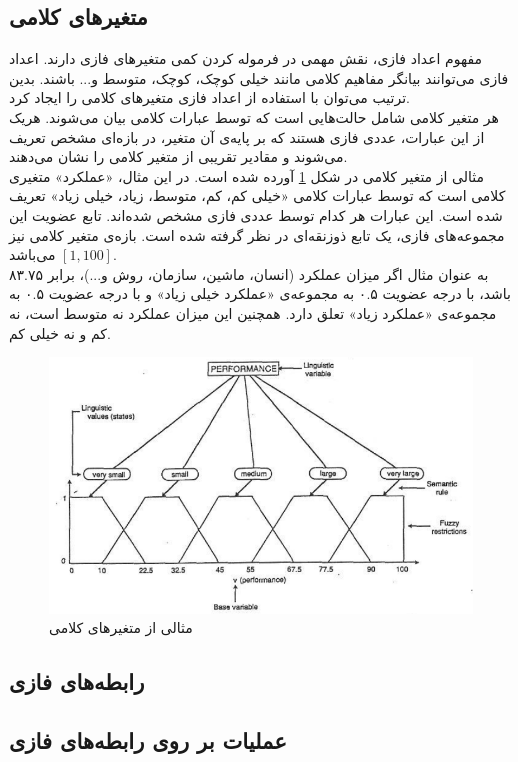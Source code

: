   \subsection{‌متغیرهای کلامی}
  مفهوم اعداد فازی، نقش مهمی در فرموله کردن کمی متغیرهای فازی دارند. اعداد فازی می‌توانند بیانگر مفاهیم کلامی مانند خیلی کوچک، کوچک، متوسط و... باشند. بدین ترتیب می‌توان با استفاده از اعداد فازی متغیرهای کلامی
   را ایجاد کرد. \\
   هر متغیر کلامی شامل حالت‌هایی است که توسط عبارات کلامی
   بیان می‌شوند. هریک از این عبارات، عددی فازی هستند که بر پایه‌ی آن متغیر، در بازه‌ای مشخص تعریف می‌شوند و مقادیر تقریبی از متغیر کلامی را نشان می‌دهند. \\
   مثالی از متغیر کلامی در شکل
   \ref{fig:f_19}
   آورده شده است. در این مثال، «عملکرد»
   متغیری کلامی است که توسط عبارات کلامی «خیلی کم، کم، متوسط، زیاد، خیلی زیاد» تعریف شده است. این عبارات هر کدام توسط عددی فازی مشخص شده‌اند. تابع عضویت این مجموعه‌های فازی، یک تابع ذوزنقه‌ای در نظر گرفته شده است. بازه‌ی متغیر کلامی نیز $[1, 100]$ می‌باشد. 
     \cite{Klir1995}
   \\
   به عنوان مثال اگر میزان عملکرد (انسان، ماشین، سازمان، روش و...)، برابر ۸۳.۷۵ باشد، با درجه عضویت ۰.۵ به مجموعه‌ی «عملکرد خیلی زیاد» و با درجه‌ عضویت ۰.۵ به مجموعه‌ی «عملکرد زیاد» تعلق دارد. همچنین این میزان عملکرد نه متوسط است، نه کم و نه خیلی کم. 

  	\begin{figure}[h]
  	\centering 
  	\includegraphics[width=125mm]{Images/Fig19.png}
  	\vspace{-0.5cm}
  	\caption{مثالی از متغیرهای کلامی}\label{fig:f_19}
  \end{figure}
 \subsection{رابطه‌های فازی}
 \subsection{عملیات بر روی رابطه‌های فازی}